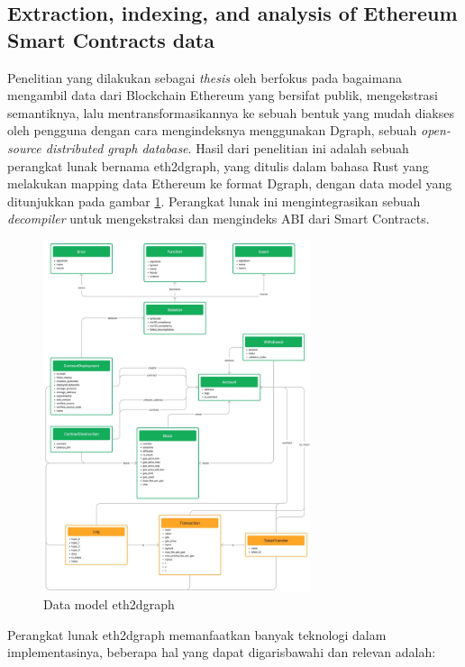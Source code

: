 \subsection{Extraction, indexing, and analysis of Ethereum Smart Contracts data}
\label{subsec:extraction-indexing-analysis-ethereum-sc}

Penelitian yang dilakukan sebagai \textit{thesis} oleh \cite{aimar2023extraction} berfokus pada bagaimana mengambil data dari Blockchain Ethereum yang bersifat publik, mengekstrasi semantiknya, lalu mentransformasikannya ke sebuah bentuk yang mudah diakses oleh pengguna dengan cara mengindeksnya menggunakan Dgraph, sebuah \textit{open-source distributed graph database}. Hasil dari penelitian ini adalah sebuah perangkat lunak bernama eth2dgraph, yang ditulis dalam bahasa Rust yang melakukan mapping data Ethereum ke format Dgraph, dengan data model yang ditunjukkan pada gambar \ref{image:eth2dgraph-structure}. Perangkat lunak ini mengintegrasikan sebuah \textit{decompiler} untuk mengekstraksi dan mengindeks ABI dari Smart Contracts.

\begin{figure}
  \centering
  \includegraphics[width=0.7\textwidth]{resources/chapter-2/eth2dgraph-structure.jpg}
  \caption{Data model eth2dgraph \parencite{aimar2023extraction}}
  \label{image:eth2dgraph-structure}
\end{figure}

Perangkat lunak eth2dgraph memanfaatkan banyak teknologi dalam implementasinya, beberapa hal yang dapat digarisbawahi dan relevan adalah:

